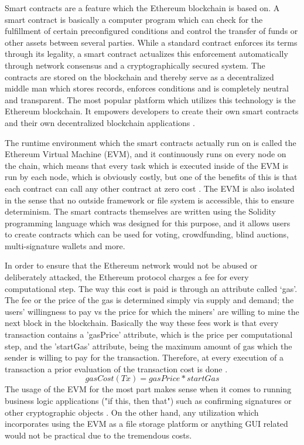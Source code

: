 Smart contracts are a feature which the Ethereum blockchain is based on. A smart contract is basically a computer program which can check for the fulfillment of certain preconfigured conditions and control the transfer of funds or other assets between several parties. While a standard contract enforces its terms through its legality, a smart contract actualizes this enforcement automatically through network consensus and a cryptographically secured system. The contracts are stored on the blockchain and thereby serve as a decentralized middle man which stores records, enforces conditions and is completely neutral and transparent. The most popular platform which utilizes this technology is the Ethereum blockchain. It empowers developers to create their own smart contracts and their own decentralized blockchain applications \cite{relatedWork38}.

The runtime environment which the smart contracts actually run on is called the Ethereum Virtual Machine (EVM), and it continuously runs on every node on the chain, which means that every task which is executed inside of the EVM is run by each node, which is obviously costly, but one of the benefits of this is that each contract can call any other contract at zero cost \cite{relatedWork38}. The EVM is also isolated in the sense that no outside framework or file system is accessible, this to ensure determinism. The smart contracts themselves are written using the Solidity programming language which was designed for this purpose, and it allows users to create contracts which can be used for voting, crowdfunding, blind auctions, multi-signature wallets and more.

In order to ensure that the Ethereum network would not be abused or deliberately attacked, the Ethereum protocol charges a fee for every computational step. The way this cost is paid is through an attribute called ‘gas’. The fee or the price of the gas is determined simply via supply and demand; the users’ willingness to pay vs the price for which the miners' are willing to mine the next block in the blockchain. Basically the way these fees work is that every transaction contains a 'gasPrice' attribute, which is the price per computational step, and the 'startGas' attribute, being the maximum amount of gas which the sender is willing to pay for the transaction. Therefore, at every execution of a transaction a prior evaluation of the transaction cost is done \cite{relatedWork38}.
				$$ gasCost(Tx)= {gasPrice * startGas}$$
The usage of the EVM for the most part makes sense when it comes to running business logic applications ("if this, then that") such as confirming signatures or other cryptographic objects \cite{relatedWork39}. On the other hand, any utilization which incorporates using the EVM as a file storage platform or anything GUI related would not be practical due to the tremendous costs.

